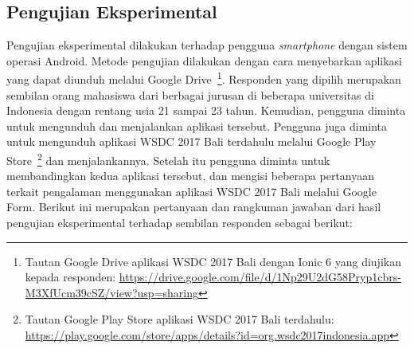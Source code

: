\subsection{Pengujian Eksperimental}
\label{subsec:pengujianEksperimental}

Pengujian eksperimental dilakukan terhadap pengguna \textit{smartphone} dengan sistem operasi Android. Metode pengujian dilakukan dengan cara menyebarkan aplikasi yang dapat diunduh melalui Google Drive~\footnote{Tautan Google Drive aplikasi WSDC 2017 Bali dengan Ionic 6 yang diujikan kepada responden: \url{https://drive.google.com/file/d/1Np29U2dG58Pryp1cbrs-M3XfUcm39cSZ/view?usp=sharing}}. Responden yang dipilih merupakan sembilan orang mahasiswa dari berbagai jurusan di beberapa universitas di Indonesia dengan rentang usia 21 sampai 23 tahun. Kemudian, pengguna diminta untuk mengunduh dan menjalankan aplikasi tersebut. Pengguna juga diminta untuk mengunduh aplikasi WSDC 2017 Bali terdahulu melalui Google Play Store~\footnote{Tautan Google Play Store aplikasi WSDC 2017 Bali terdahulu: \url{https://play.google.com/store/apps/details?id=org.wsdc2017indonesia.app}} dan menjalankannya. Setelah itu pengguna diminta untuk membandingkan kedua aplikasi tersebut, dan mengisi beberapa pertanyaan terkait pengalaman menggunakan aplikasi WSDC 2017 Bali melalui Google Form. Berikut ini merupakan pertanyaan dan rangkuman jawaban dari hasil pengujian eksperimental terhadap sembilan responden sebagai berikut:

